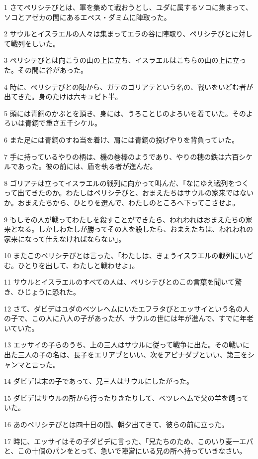 \par 1 さてペリシテびとは、軍を集めて戦おうとし、ユダに属するソコに集まって、ソコとアゼカの間にあるエペス・ダミムに陣取った。
\par 2 サウルとイスラエルの人々は集まってエラの谷に陣取り、ペリシテびとに対して戦列をしいた。
\par 3 ペリシテびとは向こうの山の上に立ち、イスラエルはこちらの山の上に立った。その間に谷があった。
\par 4 時に、ペリシテびとの陣から、ガテのゴリアテという名の、戦いをいどむ者が出てきた。身のたけは六キュビト半。
\par 5 頭には青銅のかぶとを頂き、身には、うろことじのよろいを着ていた。そのよろいは青銅で重さ五千シケル。
\par 6 また足には青銅のすね当を着け、肩には青銅の投げやりを背負っていた。
\par 7 手に持っているやりの柄は、機の巻棒のようであり、やりの穂の鉄は六百シケルであった。彼の前には、盾を執る者が進んだ。
\par 8 ゴリアテは立ってイスラエルの戦列に向かって叫んだ、「なにゆえ戦列をつくって出てきたのか。わたしはペリシテびと、おまえたちはサウルの家来ではないか。おまえたちから、ひとりを選んで、わたしのところへ下ってこさせよ。
\par 9 もしその人が戦ってわたしを殺すことができたら、われわれはおまえたちの家来となる。しかしわたしが勝ってその人を殺したら、おまえたちは、われわれの家来になって仕えなければならない」。
\par 10 またこのペリシテびとは言った、「わたしは、きょうイスラエルの戦列にいどむ。ひとりを出して、わたしと戦わせよ」。
\par 11 サウルとイスラエルのすべての人は、ペリシテびとのこの言葉を聞いて驚き、ひじょうに恐れた。
\par 12 さて、ダビデはユダのベツレヘムにいたエフラタびとエッサイという名の人の子で、この人に八人の子があったが、サウルの世には年が進んで、すでに年老いていた。
\par 13 エッサイの子らのうち、上の三人はサウルに従って戦争に出た。その戦いに出た三人の子の名は、長子をエリアブといい、次をアビナダブといい、第三をシャンマと言った。
\par 14 ダビデは末の子であって、兄三人はサウルにしたがった。
\par 15 ダビデはサウルの所から行ったりきたりして、ベツレヘムで父の羊を飼っていた。
\par 16 あのペリシテびとは四十日の間、朝夕出てきて、彼らの前に立った。
\par 17 時に、エッサイはその子ダビデに言った、「兄たちのため、このいり麦一エパと、この十個のパンをとって、急いで陣営にいる兄の所へ持っていきなさい。
